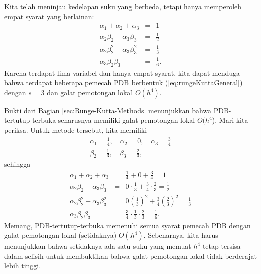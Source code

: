 \noindent Kita telah meninjau kedelapan suku yang berbeda, tetapi
hanya memperoleh empat syarat yang berlainan:
\begin{eqnarray}
\alpha_{1}+\alpha_{2}+\alpha_{3} & = & 1\nonumber \\
\alpha_{2}\beta_{2}+\alpha_{3}\beta_{3} & = & \frac{1}{2}\nonumber \\
\alpha_{2}\beta_{2}^{2}+\alpha_{3}\beta_{3}^{2} & = & \frac{1}{3}\nonumber \\
\alpha_{3}\beta_{2}\beta_{3} & = & \frac{1}{6}.\label{eq:rk3conditions}
\end{eqnarray}
Karena terdapat lima variabel dan hanya empat syarat, kita dapat menduga
bahwa terdapat beberapa pemecah PDB berbentuk (\ref{eq:rungeKuttaGeneral})
dengan $s=3$ dan galat pemotongan lokal $O(h^{4})$. 

Bukti dari Bagian \ref{sec:Runge-Kutta-Methods} menunjukkan bahwa
PDB-tertutup-terbuka seharusnya memiliki galat pemotongan lokal $O(h^{4}$).
Mari kita periksa. Untuk metode tersebut, kita memiliki
\[
\begin{gathered}\alpha_{1}=\frac{1}{4},\quad\alpha_{2}=0,\quad\alpha_{3}=\frac{3}{4}\\
\beta_{2}=\frac{1}{3},\quad\beta_{3}=\frac{2}{3},
\end{gathered}
\]
sehingga
\begin{eqnarray*}
\alpha_{1}+\alpha_{2}+\alpha_{3} & = & \frac{1}{4}+0+\frac{3}{4}=1\\
\alpha_{2}\beta_{2}+\alpha_{3}\beta_{3} & = & 0\cdot\frac{1}{3}+\frac{3}{4}\cdot\frac{2}{3}=\frac{1}{2}\\
\alpha_{2}\beta_{2}^{2}+\alpha_{3}\beta_{3}^{2} & = & 0\left(\frac{1}{3}\right)^{2}+\frac{3}{4}\left(\frac{2}{3}\right)^{2}=\frac{1}{3}\\
\alpha_{3}\beta_{2}\beta_{3} & = & \frac{3}{4}\cdot\frac{1}{3}\cdot\frac{2}{3}=\frac{1}{6}.
\end{eqnarray*}
Memang, PDB-tertutup-terbuka memenuhi semua syarat pemecah PDB dengan
galat pemotongan lokal (setidaknya) $O(h^{4})$. Sebenarnya, kita
harus menunjukkan bahwa setidaknya ada satu suku yang memuat $h^{4}$
tetap tersisa dalam selisih untuk membuktikan bahwa galat pemotongan
lokal tidak berderajat lebih tinggi.


